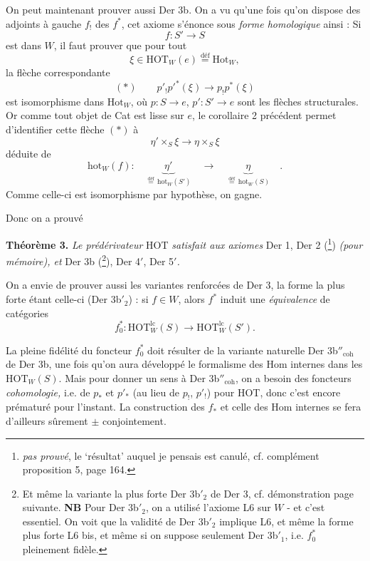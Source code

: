 \documentclass[11pt]{article}
\newcommand{\msp}[1]{\marginpar{\footnotesize [#1]}}
\newcommand{\hot}{\mathrm{hot}}
\newcommand{\HOT}{\mathrm{HOT}}
\begin{document}
On peut maintenant prouver aussi Der 3b. On a vu qu'une fois qu'on dispose des adjoints à gauche $f_!$ des $f^*$, cet axiome s'énonce sous \textit{forme homologique} ainsi : Si
\[f : S'\longrightarrow S\]
est dans $W$, il faut prouver que pour tout
\[\xi\in\HOT_W(e)\overset{\text{déf}}{=}\mathrm{Hot}_W,\]
la flèche correspondante
\[(*)\qquad p'_!p'^*(\xi)\longrightarrow p_!p^*(\xi)\]
est isomorphisme dans $\mathrm{Hot}_W$, où $p : S\longrightarrow e$, $p' : S'\longrightarrow e$ sont les flèches structurales. Or comme tout objet de Cat est lisse sur $e$, le corollaire 2 précédent permet d'identifier cette flèche $(*)$ à
\[\eta'\times_S\xi\longrightarrow\eta\times_S\xi\]
\msp{159}
déduite de
\[\hot_W(f) :\quad\underbrace{\ \eta'\ }_{\overset{\text{déf}}{=}\,\hot_W(S')}\quad\longrightarrow\quad\underbrace{\ \eta\ }_{\overset{\text{déf}}{=}\,\hot_W(S)}\quad.\]
Comme celle-ci est isomorphisme par hypothèse, on gagne.

Donc on a prouvé

\textbf{Théorème 3.} \textit{Le prédérivateur} HOT \textit{satisfait aux axiomes} Der 1, Der 2 (\footnote[76]{\textit{pas prouvé}, le ‘résultat’ auquel je pensais est canulé, cf. complément proposition 5, page 164.}) \textit{(pour mémoire), et} Der 3b (\footnote[77]{Et même la variante la plus forte Der 3b$'_2$ de Der 3, cf. démonstration page suivante. \textbf{NB} Pour Der 3b$'_2$, on a utilisé l'axiome L6 sur $W$ - et c'est essentiel. On voit que la validité de Der 3b$'_2$ implique L6, et même la forme plus forte L6 bis, et même si on suppose seulement Der 3b$'_1$, i.e. $f_0^*$ pleinement fidèle.}), Der 4$'$, Der 5$'$\textit{.} %

On a envie de prouver aussi les variantes renforcées de Der 3, la forme la plus forte étant celle-ci (Der 3b$'_2$) : si $f\in W$, alors $f^*$ induit une \textit{équivalence} de catégories
\[f_0^* : \HOT^{\mathrm{lc}}_W(S)\longrightarrow\HOT^{\mathrm{lc}}_W(S').\]

La pleine fidélité du foncteur $f_0^*$ doit résulter de la variante naturelle Der 3b$''_{\mathrm{coh}}$ de Der 3b, une fois qu'on aura développé le formalisme des Hom internes dans les $\HOT_W(S)$. Mais pour donner un sens à Der 3b$''_{\mathrm{coh}}$, on a besoin des foncteurs \textit{cohomologie,} i.e. de $p_*$ et $p'_*$ (au lieu de $p_!$, $p'_!$) pour HOT, donc c'est encore prématuré pour l'instant. La construction des $f_*$ et celle des Hom internes se fera d'ailleurs sûrement $\pm$ conjointement.
\end{document}
